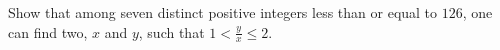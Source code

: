Show that among seven distinct positive integers less than or equal to $126$, one can find two, $x$ and $y$, such that $1 < \frac{y}{x} \leq 2$.
